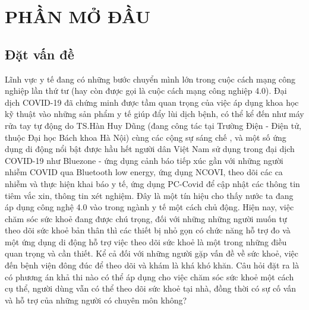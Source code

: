 
\section*{PHẦN MỞ ĐẦU}
\subsection*{Đặt vấn đề}
Lĩnh vực y tế đang có những bước chuyển mình lớn trong cuộc cách mạng công nghiệp lần thứ tư 
(hay còn được gọi là cuộc cách mạng công nghiệp 4.0). Đại dịch COVID-19 đã chứng minh được tầm quan trọng của việc áp dụng
khoa học kỹ thuật vào những sản phẩm y tế giúp đẩy lùi dịch bệnh,
có thể kể đến như máy rửa tay tự động do TS.Hàn Huy Dũng (đang công tác tại Trường Điện - Điện tử, thuộc Đại học Bách khoa Hà Nội) 
cùng các cộng sự sáng chế \cite{ref_thay_dzung}, và một số ứng dụng di động
nổi bật được hầu hết người dân Việt Nam sử dụng trong đại dịch COVID-19 như Bluezone - ứng dụng cảnh báo tiếp xúc gần với
những người nhiễm COVID qua Bluetooth low energy, ứng dụng NCOVI, theo dõi các ca nhiễm và thực hiện khai báo y tế, ứng
dụng PC-Covid để cập nhật các thông tin tiêm vắc xin, thông tin xét nghiệm. Đây là một tín hiệu cho thấy nước ta đang áp
dụng công nghệ 4.0 vào trong ngành y tế một cách chủ động. Hiện nay, việc chăm sóc sức khoẻ đang được chú trọng, đối với 
những những người muốn tự theo dõi sức khoẻ bản thân
thì các thiết bị nhỏ gọn có chức năng hỗ trợ đo và một ứng dụng di động hỗ trợ việc theo dõi sức khoẻ là một trong những
điều quan trọng và cần thiết. Kể cả đối với những người gặp vấn đề về sức khoẻ, việc đến bệnh viện đông đúc để theo dõi
và khám là khá khó khăn. Câu hỏi đặt ra là có phương án khả thi nào có thể áp dụng cho việc chăm sóc sức khoẻ một cách cụ thể, 
người dùng vẫn có thể theo dõi sức khoẻ tại nhà, đồng thời có sự cố vấn và hỗ trợ của những người có chuyên môn không?

